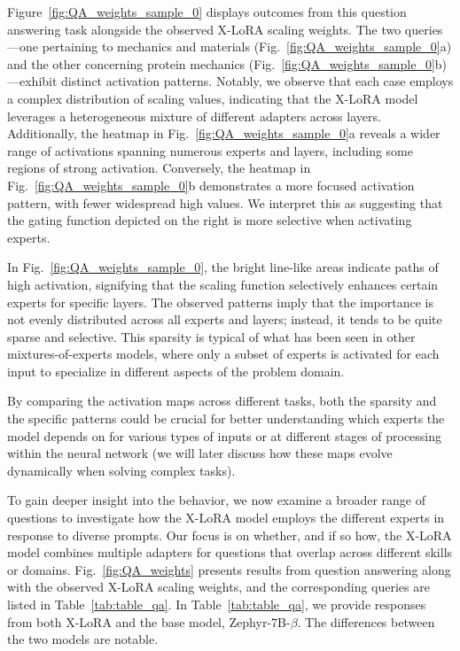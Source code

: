 Figure~\ref{fig:QA_weights_sample_0} displays outcomes from this question answering task alongside the observed X-LoRA scaling weights. The two queries—one pertaining to mechanics and materials (Fig.~\ref{fig:QA_weights_sample_0}a) and the other concerning protein mechanics (Fig.~\ref{fig:QA_weights_sample_0}b)—exhibit distinct activation patterns. Notably, we observe that each case employs a complex distribution of scaling values, indicating that the X-LoRA model leverages a heterogeneous mixture of different adapters across layers. Additionally, the heatmap in Fig.~\ref{fig:QA_weights_sample_0}a reveals a wider range of activations spanning numerous experts and layers, including some regions of strong activation. Conversely, the heatmap in Fig.~\ref{fig:QA_weights_sample_0}b demonstrates a more focused activation pattern, with fewer widespread high values. We interpret this as suggesting that the gating function depicted on the right is more selective when activating experts.

In Fig.~\ref{fig:QA_weights_sample_0}, the bright line-like areas indicate paths of high activation, signifying that the scaling function selectively enhances certain experts for specific layers. The observed patterns imply that the importance is not evenly distributed across all experts and layers; instead, it tends to be quite sparse and selective. This sparsity is typical of what has been seen in other mixtures-of-experts models, where only a subset of experts is activated for each input to specialize in different aspects of the problem domain.

By comparing the activation maps across different tasks, both the sparsity and the specific patterns could be crucial for better understanding which experts the model depends on for various types of inputs or at different stages of processing within the neural network (we will later discuss how these maps evolve dynamically when solving complex tasks).

To gain deeper insight into the behavior, we now examine a broader range of questions to investigate how the X-LoRA model employs the different experts in response to diverse prompts. Our focus is on whether, and if so how, the X-LoRA model combines multiple adapters for questions that overlap across different skills or domains. Fig.~\ref{fig:QA_weights} presents results from question answering along with the observed X-LoRA scaling weights, and the corresponding queries are listed in Table~\ref{tab:table_qa}. In Table~\ref{tab:table_qa}, we provide responses from both X-LoRA and the base model, Zephyr-7B-$\beta$. The differences between the two models are notable.

